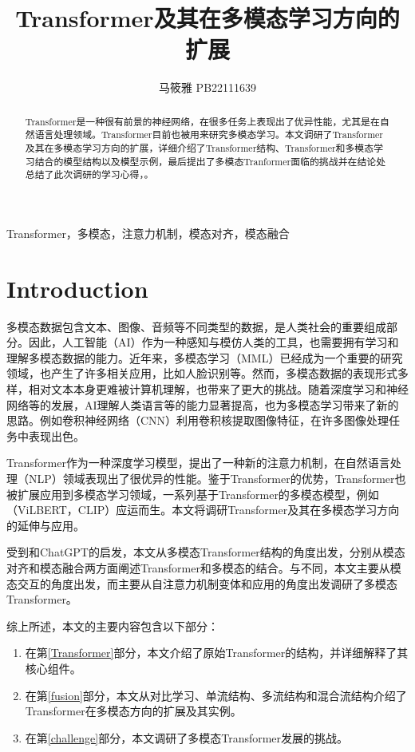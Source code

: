 \documentclass[journal]{IEEEtran}
\begin{document}
\title{Transformer及其在多模态学习方向的扩展}

\author{马筱雅 PB22111639}

\maketitle

\begin{abstract}
Transformer是一种很有前景的神经网络，在很多任务上表现出了优异性能，尤其是在自然语言处理领域。Transformer目前也被用来研究多模态学习。本文调研了Transformer及其在多模态学习方向的扩展，详细介绍了Transformer结构、Transformer和多模态学习结合的模型结构以及模型示例，最后提出了多模态Tranformer面临的挑战并在结论处总结了此次调研的学习心得，。
\end{abstract}

\begin{IEEEkeywords}
Transformer，多模态，注意力机制，模态对齐，模态融合
\end{IEEEkeywords}

\section{Introduction}
多模态数据包含文本、图像、音频等不同类型的数据，是人类社会的重要组成部分。因此，人工智能（AI）作为一种感知与模仿人类的工具，也需要拥有学习和理解多模态数据的能力。近年来，多模态学习（MML）已经成为一个重要的研究领域，也产生了许多相关应用，比如人脸识别等。然而，多模态数据的表现形式多样，相对文本本身更难被计算机理解，也带来了更大的挑战。随着深度学习和神经网络等的发展，AI理解人类语言等的能力显著提高，也为多模态学习带来了新的思路。例如卷积神经网络（CNN）利用卷积核提取图像特征，在许多图像处理任务中表现出色。

Transformer\cite{vaswani2017attention}作为一种深度学习模型，提出了一种新的注意力机制，在自然语言处理（NLP）领域表现出了很优异的性能。鉴于Transformer的优势，Transformer也被扩展应用到多模态学习领域，一系列基于Transformer的多模态模型，例如（ViLBERT\cite{lu2019vilbert}，CLIP\cite{radford2021learning}）应运而生。本文将调研Transformer及其在多模态学习方向的延伸与应用。

受到\cite{10123038}和ChatGPT的启发，本文从多模态Transformer结构的角度出发，分别从模态对齐和模态融合两方面阐述Transformer和多模态的结合。与\cite{10123038}不同，本文主要从模态交互的角度出发，而\cite{10123038}主要从自注意力机制变体和应用的角度出发调研了多模态Transformer。

综上所述，本文的主要内容包含以下部分：
\begin{enumerate}
\item 在第\ref{Transformer}部分，本文介绍了原始Transformer的结构，并详细解释了其核心组件。
\item 在第\ref{fusion}部分，本文从对比学习、单流结构、多流结构和混合流结构介绍了Transformer在多模态方向的扩展及其实例。
\item 在第\ref{challenge}部分，本文调研了多模态Transformer发展的挑战。
\end{enumerate}
\end{document}
